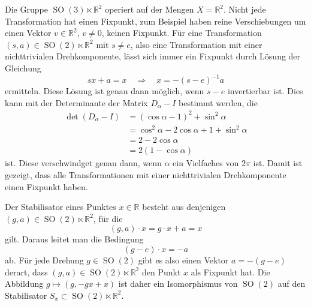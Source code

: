 \begin{beispiel}
\label{buch:nichtkomm:homogen:bsp:SO3}
Die Gruppe $\operatorname{SO}(3)\ltimes\mathbb{R}^2$ operiert auf der
Mengen $X=\mathbb{R}^2$.
Nicht jede Transformation hat einen Fixpunkt, zum Beispiel haben reine
Verschiebungen um einen Vektor $v\in\mathbb{R}^2$, $v\ne 0$, keinen
Fixpunkt.
Für eine Transformation $(s,a)\in\operatorname{SO}(2)\ltimes \mathbb{R}^2$
mit $s\ne e$, also eine Transformation mit einer nichttrivialen
Drehkomponente, lässt sich immer ein Fixpunkt durch Lösung der 
Gleichung
\[
sx+a=x
\quad\Rightarrow\quad
x = -(s-e)^{-1}a
\]
ermitteln.
Diese Lösung ist genau dann möglich, wenn $s-e$ invertierbar ist.
Dies kann mit der Determinante der Matrix $D_\alpha-I$ bestimmt werden,
die
\begin{align*}
\det(D_\alpha-I)
&=
(\cos\alpha-1)^2+\sin^2\alpha
\\
&=
\cos^2\alpha-2\cos\alpha +1+\sin^2\alpha
\\
&=
2-2\cos\alpha 
\\
&=
2(1-\cos\alpha)
\end{align*}
ist.
Diese verschwindget genau dann, wenn $\alpha$ ein Vielfaches von $2\pi$ ist.
Damit ist gezeigt, dass alle Transformationen mit einer nichttrivialen
Drehkomponente einen Fixpunkt haben.

Der Stabilisator eines Punktes $x\in\mathbb{R}$ besteht aus denjenigen
$(g,a)\in\operatorname{SO}(2)\ltimes \mathbb{R}^2$, für die
\[
(g,a)\cdot x = g\cdot x+a = x
\]
gilt.
Daraus leitet man die Bedingung 
\[
(g-e)\cdot x = -a
\]
ab.
Für jede Drehung $g\in\operatorname{SO}(2)$ gibt es also einen Vektor
$a=-(g-e)$ derart, dass $(g,a)\in\operatorname{SO}(2)\ltimes\mathbb{R}^2$
den Punkt $x$ als Fixpunkt hat.
Die Abbildung $g\mapsto(g,-gx+x)$ ist daher ein Isomorphismus von
$\operatorname{SO}(2)$ auf den Stabilisator
$S_x\subset \operatorname{SO}(2)\ltimes \mathbb{R}^2$.
\end{beispiel}

